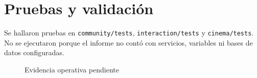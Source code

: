 \chapter{Pruebas y validación}Se hallaron pruebas en \texttt{community/tests}, \texttt{interaction/tests} y \texttt{cinema/tests}. No se ejecutaron porque el informe no contó con servicios, variables ni bases de datos configuradas.\begin{figure}[H]\centering{}\caption{Evidencia operativa pendiente}\label{fig:evidencia_pendiente}\end{figure}

